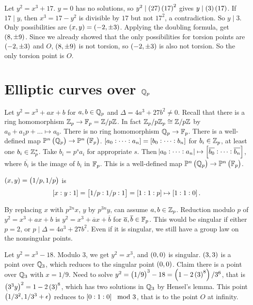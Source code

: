 \begin{example*}
Let $ y^2 = x^3 + 17 $. $ y = 0 $ has no solutions, so $ y^2 \mid \br{27}\br{17}^2 $ gives $ y \mid \br{3}\br{17} $. If $ 17 \mid y $, then $ x^3 = 17 - y^2 $ is divisible by $ 17 $ but not $ 17^2 $, a contradiction. So $ y \mid 3 $. Only possibilities are $ \br{x, y} = \br{-2, \pm 3} $. Applying the doubling formula, get $ \br{8, \pm 9} $. Since we already showed that the only possibilities for torsion points are $ \br{-2, \pm 3} $ and $ O $, $ \br{8, \pm 9} $ is not torsion, so $ \br{-2, \pm 3} $ is also not torsion. So the only torsion point is $ O $.
\end{example*}

\pagebreak

\section{Elliptic curves over \texorpdfstring{$ \mathbb{Q}_p $}{Qp}}


Let $ y^2 = x^3 + ax + b $ for $ a, b \in \mathbb{Q}_p $ and $ \Delta = 4a^3 + 27b^2 \ne 0 $. Recall that there is a ring homomorphism $ \mathbb{Z}_p \to \mathbb{F}_p = \mathbb{Z} / p\mathbb{Z} $. In fact $ \mathbb{Z}_p / p\mathbb{Z}_p \cong \mathbb{Z} / p\mathbb{Z} $ by $ a_0 + a_1p + \dots \mapsto a_0 $. There is no ring homomorphism $ \mathbb{Q}_p \to \mathbb{F}_p $. There is a well-defined map $ \P^n\br{\Q_p} \to \P^n\br{\F_p} $. $ \sbr{a_0 : \dots : a_n} = \sbr{b_0 : \dots : b_n} $ for $ b_i \in \mathbb{Z}_p $, at least one $ b_i \in \mathbb{Z}_p^* $. Take $ b_i = p^sa_i $ for appropriate $ s $. Then $ \abs{a_0 : \dots : a_n} \mapsto \sbr{\overline{b_0} : \dots : \overline{b_n}} $, where $ \overline{b_i} $ is the image of $ b_i $ in $ \mathbb{F}_p $. This is a well-defined map $ \P^n\br{\Q_p} \to \P^n\br{\F_p} $.

\begin{example*}
$ \br{x, y} = \br{1 / p, 1 / p} $ is
$$ \sbr{x : y : 1} = \sbr{1 / p : 1 / p : 1} = \sbr{1 : 1 : p} \mapsto \sbr{1 : 1 : 0}. $$
\end{example*}

By replacing $ x $ with $ p^{2n}x $, $ y $ by $ p^{3n}y $, can assume $ a, b \in \mathbb{Z}_p $. Reduction modulo $ p $ of $ y^2 = x^3 + ax + b $ is $ y^2 = x^3 + \overline{a}x + \overline{b} $ for $ \overline{a}, \overline{b} \in \mathbb{F}_p $. This would be singular if either $ p = 2 $, or $ p \mid \Delta = 4a^3 + 27b^2 $. Even if it is singular, we still have a group law on the nonsingular points.

\begin{example*}
Let $ y^2 = x^3 - 18 $. Modulo $ 3 $, we get $ y^2 = x^3 $, and $ \br{0, 0} $ is singular. $ \br{3, 3} $ is a point over $ \mathbb{Q}_3 $, which reduces to the singular point $ \br{0, 0} $. Claim there is a point over $ \mathbb{Q}_3 $ with $ x = 1 / 9 $. Need to solve $ y^2 = \br{1 / 9}^3 - 18 = \br{1 - 2\br{3}^8} / 3^6 $, that is $ \br{3^3y}^2 = 1 - 2\br{3}^8 $, which has two solutions in $ \mathbb{Q}_3 $ by Hensel's lemma. This point $ \br{1 / 3^2, 1 / 3^3 + \epsilon} $ reduces to $ \sbr{0 : 1 : 0} \mod 3 $, that is to the point $ O $ at infinity.
\end{example*}


